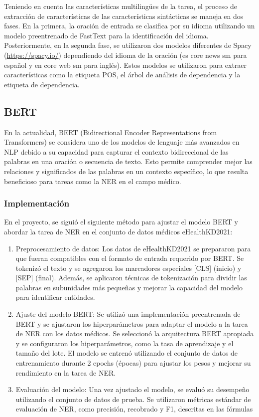 \documentclass[10pt]{article} %
\begin{document}
	Teniendo en cuenta las características multilingües de la tarea, el proceso de extracción de características de las características sintácticas se maneja en dos fases. En la primera, la oración de entrada se clasifica por su idioma utilizando un modelo preentrenado de FastText para la identificación del idioma. Posteriormente, en la segunda fase, se utilizaron dos modelos diferentes de Spacy (\url{https://spacy.io/}) dependiendo del idioma de la oración (es core news sm para español y en core web sm para inglés). Estos modelos se utilizaron para extraer características como la etiqueta POS, el árbol de análisis de dependencia y la etiqueta de dependencia.
	
	\subsection{BERT}
	
	En la actualidad, BERT (Bidirectional Encoder Representations from Transformers) se considera uno de los modelos de lenguaje más avanzados en NLP debido a su capacidad para capturar el contexto bidireccional de las palabras en una oración o secuencia de texto. Esto permite comprender mejor las relaciones y significados de las palabras en un contexto específico, lo que resulta beneficioso para tareas como la NER en el campo médico.
	
	\subsubsection{Implementaci\'on}
	En el proyecto, se siguió el siguiente método para ajustar el modelo BERT y abordar la tarea de NER en el conjunto de datos médicos eHealthKD2021:
	
	\begin{enumerate}
		\item Preprocesamiento de datos: Los datos de eHealthKD2021 se prepararon para que fueran compatibles con el formato de entrada requerido por BERT. Se tokenizó el texto y se agregaron los marcadores especiales [CLS] (inicio) y [SEP] (final). Además, se aplicaron técnicas de tokenización para dividir las palabras en subunidades más pequeñas y mejorar la capacidad del modelo para identificar entidades.
		
		\item Ajuste del modelo BERT: Se utilizó una implementación preentrenada de BERT y se ajustaron los hiperparámetros para adaptar el modelo a la tarea de NER con los datos médicos. Se seleccionó la arquitectura BERT apropiada y se configuraron los hiperparámetros, como la tasa de aprendizaje y el tamaño del lote. El modelo se entrenó utilizando el conjunto de datos de entrenamiento durante 2 epochs (épocas) para ajustar los pesos y mejorar su rendimiento en la tarea de NER.
		
		\item Evaluación del modelo: Una vez ajustado el modelo, se evaluó su desempeño utilizando el conjunto de datos de prueba. Se utilizaron métricas estándar de evaluación de NER, como precisión, recobrado y F1, descritas en las f\'ormulas 
	\end{enumerate}
	
\end{document}
